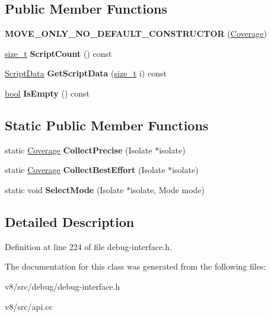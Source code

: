 \subsection*{Public Member Functions}
\begin{DoxyCompactItemize}
\item 
\mbox{\label{classv8_1_1debug_1_1Coverage_a7bdcdbed256507df025bc5dba878ffbe}} 
{\bfseries M\+O\+V\+E\+\_\+\+O\+N\+L\+Y\+\_\+\+N\+O\+\_\+\+D\+E\+F\+A\+U\+L\+T\+\_\+\+C\+O\+N\+S\+T\+R\+U\+C\+T\+OR} (\mbox{\hyperlink{classv8_1_1debug_1_1Coverage}{Coverage}})
\item 
\mbox{\label{classv8_1_1debug_1_1Coverage_afc0356c43296a0df11da5ebf1cab8049}} 
\mbox{\hyperlink{classsize__t}{size\+\_\+t}} {\bfseries Script\+Count} () const
\item 
\mbox{\label{classv8_1_1debug_1_1Coverage_ad4a55e808ceed0c4ac5c9abe51039f76}} 
\mbox{\hyperlink{classv8_1_1debug_1_1Coverage_1_1ScriptData}{Script\+Data}} {\bfseries Get\+Script\+Data} (\mbox{\hyperlink{classsize__t}{size\+\_\+t}} i) const
\item 
\mbox{\label{classv8_1_1debug_1_1Coverage_ab86b71059e98f00664682109f07f1b3c}} 
\mbox{\hyperlink{classbool}{bool}} {\bfseries Is\+Empty} () const
\end{DoxyCompactItemize}
\subsection*{Static Public Member Functions}
\begin{DoxyCompactItemize}
\item 
\mbox{\label{classv8_1_1debug_1_1Coverage_aed67415f98c28938939ac7a01e6bc49a}} 
static \mbox{\hyperlink{classv8_1_1debug_1_1Coverage}{Coverage}} {\bfseries Collect\+Precise} (Isolate $\ast$isolate)
\item 
\mbox{\label{classv8_1_1debug_1_1Coverage_a050ccf29e342dfd6384d7e6ecc8768fe}} 
static \mbox{\hyperlink{classv8_1_1debug_1_1Coverage}{Coverage}} {\bfseries Collect\+Best\+Effort} (Isolate $\ast$isolate)
\item 
\mbox{\label{classv8_1_1debug_1_1Coverage_aecbcf13f0fff39e490ff5b66c0688442}} 
static void {\bfseries Select\+Mode} (Isolate $\ast$isolate, Mode mode)
\end{DoxyCompactItemize}


\subsection{Detailed Description}


Definition at line 224 of file debug-\/interface.\+h.



The documentation for this class was generated from the following files\+:\begin{DoxyCompactItemize}
\item 
v8/src/debug/debug-\/interface.\+h\item 
v8/src/api.\+cc\end{DoxyCompactItemize}
